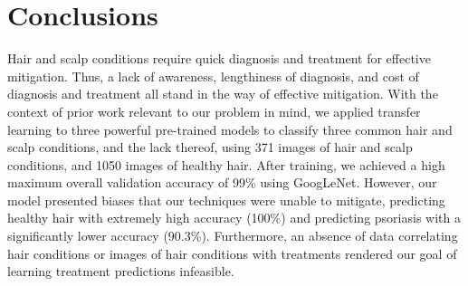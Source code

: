 \documentclass[10pt,twocolumn,letterpaper]{article}
\begin{document}
\section{Conclusions}
Hair and scalp conditions require quick diagnosis and treatment for effective mitigation. Thus, a lack of awareness, lengthiness of diagnosis, and cost of diagnosis and treatment all stand in the way of effective mitigation. With the context of prior work relevant to our problem in mind, we applied transfer learning to three powerful pre-trained models to classify three common hair and scalp conditions, and the lack thereof, using 371 images of hair and scalp conditions, and 1050 images of healthy hair. After training, we achieved a high maximum overall validation accuracy of 99\% using GoogLeNet. However, our model presented biases that our techniques were unable to mitigate, predicting healthy hair with extremely high accuracy (100\%) and predicting psoriasis with a significantly lower accuracy (90.3\%). Furthermore, an absence of data correlating hair conditions or images of hair conditions with treatments rendered our goal of learning treatment predictions infeasible.
{\small
\nocite{*}


}
\end{document}
